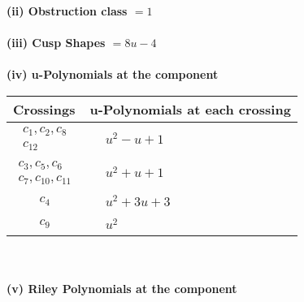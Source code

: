 \documentclass[1p]{elsarticle_modified}
\theoremstyle{definition}
\begin{document}
\flushleft \textbf{(ii) Obstruction class $= 1$}\\~\\
\flushleft \textbf{(iii) Cusp Shapes $= 8 u-4$}\\~\\
\newpage\renewcommand{\arraystretch}{1}
\flushleft \textbf{(iv) u-Polynomials at the component}\newline \\
\begin{tabular}{m{50pt}|m{274pt}}
Crossings & \hspace{64pt}u-Polynomials at each crossing \\
\hline $$\begin{aligned}c_{1},c_{2},c_{8}\\c_{12}\end{aligned}$$&$\begin{aligned}
&u^2- u+1
\end{aligned}$\\
\hline $$\begin{aligned}c_{3},c_{5},c_{6}\\c_{7},c_{10},c_{11}\end{aligned}$$&$\begin{aligned}
&u^2+u+1
\end{aligned}$\\
\hline $$\begin{aligned}c_{4}\end{aligned}$$&$\begin{aligned}
&u^2+3 u+3
\end{aligned}$\\
\hline $$\begin{aligned}c_{9}\end{aligned}$$&$\begin{aligned}
&u^2
\end{aligned}$\\
\hline
\end{tabular}\\~\\
\newpage\renewcommand{\arraystretch}{1}
\flushleft \textbf{(v) Riley Polynomials at the component}\newline \\
\end{document}

